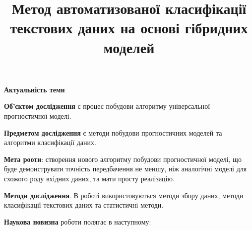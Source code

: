 \documentclass[14pt]{article}
\begin{document}
\title{Метод автоматизованої класифікації текстових даних на основі гібридних моделей}


\textbf{Актуальність теми}

\textbf{Об'єктом дослідження} є процес побудови алгоритму універсальної прогностичної моделі.

\textbf{Предметом дослідження} є методи побудови прогностичних моделей та алгоритми класифікації даних.

\textbf{Мета рооти}: створення нового алгоритму побудови прогностичної моделі, що буде демонструвати точність передбачення не меншу, ніж аналогічні моделі для схожого роду вхідних даних, та мати просту реалізацію.

\textbf{Методи дослідження}. В роботі використовуються методи збору даних, методи класифікації текстових даних та статистичні методи.

\textbf{Наукова новизна} роботи полягає в наступному:
\end{document}
